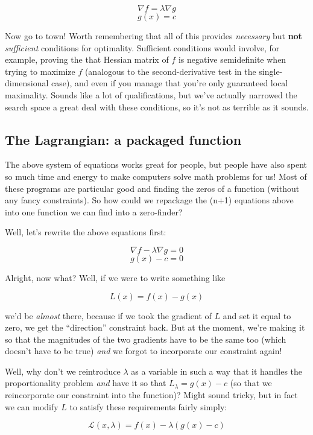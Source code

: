 \documentclass[letterpaper,12pt]{report}
\begin{document}
\[\nabla f = \lambda \nabla g \] \[g(x) = c\]

Now go to town! Worth remembering that all of this provides
\emph{necessary} but \textbf{not} \emph{sufficient} conditions for
optimality. Sufficient conditions would involve, for example, proving
the that Hessian matrix of \(f\) is negative semidefinite when trying to
maximize \(f\) (analogous to the second-derivative test in the
single-dimensional case), and even if you manage that you're only
guaranteed local maximality. Sounds like a lot of qualifications, but
we've actually narrowed the search space a great deal with these
conditions, so it's not as terrible as it sounds.

\label{sec:the-lagrangian-a-packaged-function}
\subsection{The Lagrangian: a packaged function} 

The above system of equations works great for people, but people have
also spent so much time and energy to make computers solve math problems
for us! Most of these programs are particular good and finding the zeros
of a function (without any fancy constraints). So how could we repackage
the (n+1) equations above into one function we can find into a
zero-finder?

Well, let's rewrite the above equations first:

\[\nabla f - \lambda \nabla g = 0\] \[g(x) - c = 0\]

Alright, now what? Well, if we were to write something like

\[ L(x) = f(x) - g(x) \]

we'd be \emph{almost} there, because if we took the gradient of \(L\)
and set it equal to zero, we get the ``direction'' constraint back. But at
the moment, we're making it so that the magnitudes of the two gradients
have to be the same too (which doesn't have to be true) \emph{and} we
forgot to incorporate our constraint again!

Well, why don't we reintroduce \(\lambda\) as a variable in such a way
that it handles the proportionality problem \emph{and} have it so that
\(L_{\lambda} = g(x) - c\) (so that we reincorporate our constraint into
the function)? Might sound tricky, but in fact we can modify \(L\) to
satisfy these requirements fairly simply:

\[ \mathcal{L}(x, \lambda) = f(x) - \lambda \left(g(x) - c\right) \]
\end{document}
